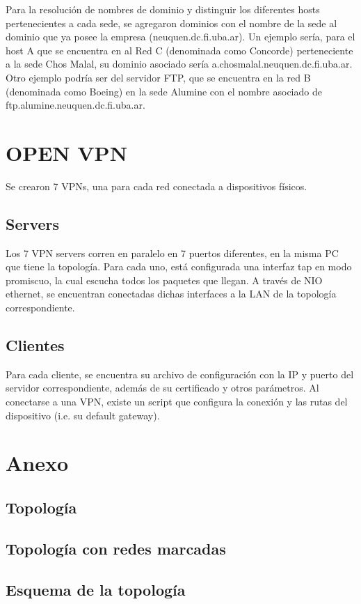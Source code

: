 \documentclass[12pt, a4paper, spanish]{article}
\begin{document}
Para la resolución de nombres de dominio y distinguir los diferentes hosts 
pertenecientes a cada sede, se agregaron dominios con el nombre de la sede 
al dominio que ya posee la empresa (neuquen.dc.fi.uba.ar).
Un ejemplo sería, para el host A que se encuentra en al Red C (denominada 
como Concorde) perteneciente a la sede Chos Malal, su dominio asociado sería 
a.chosmalal.neuquen.dc.fi.uba.ar.
Otro ejemplo podría ser del servidor FTP, que se encuentra en la red B 
(denominada como Boeing) en la sede Alumine con el nombre asociado de 
ftp.alumine.neuquen.dc.fi.uba.ar.

\section{OPEN VPN}
Se crearon 7 VPNs, una para cada red conectada a dispositivos físicos.

\subsection{Servers}
Los 7 VPN servers corren en paralelo en 7 puertos diferentes, en la misma PC 
que tiene la topología.
Para cada uno, está configurada una interfaz tap en modo promiscuo, la cual 
escucha todos los paquetes que llegan.
A través de NIO ethernet, se encuentran conectadas dichas interfaces a la LAN 
de la topología correspondiente.

\subsection{Clientes}
Para cada cliente, se encuentra su archivo de configuración con la IP y 
puerto del servidor correspondiente, además de su certificado y otros 
parámetros.
Al conectarse a una VPN, existe un script que configura la conexión y 
las rutas del dispositivo (i.e. su default gateway).

\newpage
\section{Anexo}
\subsection{Topología}
\subsection{Topología con redes marcadas}

\subsection{Esquema de la topología}
\end{document}
